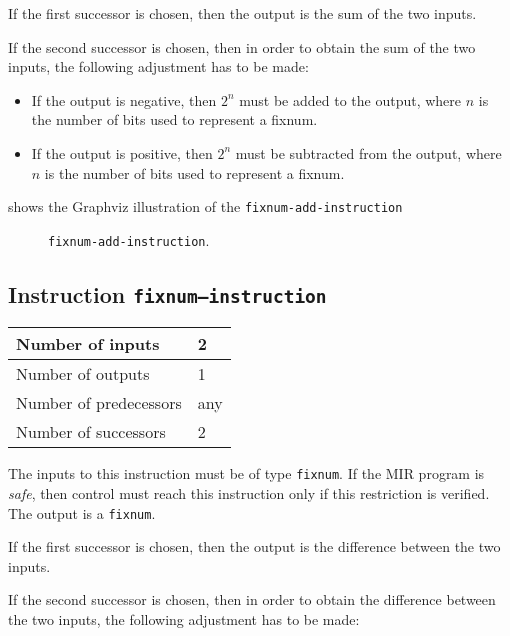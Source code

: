 If the first successor is chosen, then the output is
the sum of the two inputs.  

If the second successor is chosen, then in order to obtain the sum of the
two inputs, the following adjustment has to be made:

\begin{itemize}
\item If the output is negative, then $2^n$ must be added to the
  output, where $n$ is the number of bits used to represent a fixnum. 
\item If the output is positive, then $2^n$ must be subtracted from
  the output, where $n$ is the number of bits used to represent a
  fixnum.
\end{itemize}

 shows the Graphviz illustration of the
\texttt{fixnum-add-instruction}

\begin{figure}
\begin{center}
\end{center}
\caption{\label{fig-fixnum-add-instruction}
\texttt{fixnum-add-instruction}.}
\end{figure}

\subsection{Instruction \texttt{fixnum---instruction}}
\label{mir-instruction-fixnum--}

\begin{tabular}{|l|l|}
\hline
Number of inputs & 2\\
\hline
Number of outputs & 1\\
\hline
Number of predecessors & any\\
\hline
Number of successors & 2\\
\hline
\end{tabular}

The inputs to this instruction must be of type \texttt{fixnum}.  If the
MIR program is \emph{safe}, then control must reach this instruction
only if this restriction is verified.  The output is a
\texttt{fixnum}.  

If the first successor is chosen, then the output is
the difference between the two inputs.  

If the second successor is chosen, then in order to obtain the difference
between the two inputs, the following adjustment has to be made:

